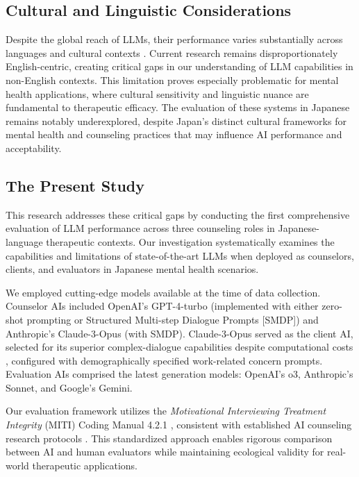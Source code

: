 \documentclass{wiley-article}
\begin{document}
\subsection*{Cultural and Linguistic Considerations}

Despite the global reach of LLMs, their performance varies substantially across languages and cultural contexts \citep{zhongCulturalValueDifferences2024}. Current research remains disproportionately English-centric, creating critical gaps in our understanding of LLM capabilities in non-English contexts. This limitation proves especially problematic for mental health applications, where cultural sensitivity and linguistic nuance are fundamental to therapeutic efficacy. The evaluation of these systems in Japanese remains notably underexplored, despite Japan's distinct cultural frameworks for mental health and counseling practices that may influence AI performance and acceptability.

\subsection*{The Present Study}

This research addresses these critical gaps by conducting the first comprehensive evaluation of LLM performance across three counseling roles in Japanese-language therapeutic contexts. Our investigation systematically examines the capabilities and limitations of state-of-the-art LLMs when deployed as counselors, clients, and evaluators in Japanese mental health scenarios.

We employed cutting-edge models available at the time of data collection. Counselor AIs included OpenAI's GPT-4-turbo (implemented with either zero-shot prompting or Structured Multi-step Dialogue Prompts [SMDP]) and Anthropic's Claude-3-Opus (with SMDP). Claude-3-Opus served as the client AI, selected for its superior complex-dialogue capabilities despite computational costs \citep{berrezueta-guzmanExploringEfficacyRobotic2024}, configured with demographically specified work-related concern prompts. Evaluation AIs comprised the latest generation models: OpenAI's o3, Anthropic's Sonnet, and Google's Gemini.

Our evaluation framework utilizes the \textit{Motivational Interviewing Treatment Integrity} (MITI) Coding Manual 4.2.1 \citep{moyers2014motivational}, consistent with established AI counseling research protocols \citep{cohenMotivationalInterviewingTranscripts2024,steenstraVirtualAgentsAlcohol2024,yangCAMICounselorAgent2025}. This standardized approach enables rigorous comparison between AI and human evaluators while maintaining ecological validity for real-world therapeutic applications.
\end{document}
